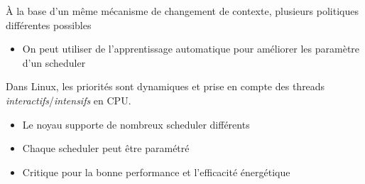 À la base d'un même mécanisme de changement de contexte, plusieurs
politiques différentes possibles

\begin{itemize}
\tightlist
\item
  On peut utiliser de l'apprentissage automatique pour améliorer les
  paramètre d'un scheduler
\end{itemize}

Dans Linux, les priorités sont dynamiques et prise en compte des threads
\emph{interactifs}/\emph{intensifs} en CPU.

\begin{itemize}
\tightlist
\item
  Le noyau supporte de nombreux scheduler différents
\item
  Chaque scheduler peut être paramétré
\item
  Critique pour la bonne performance et l'efficacité énergétique
\end{itemize}
